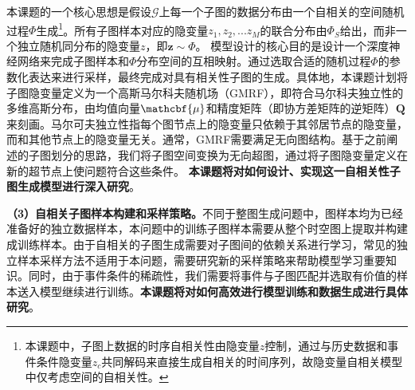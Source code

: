 \documentclass[12pt,UTF8,AutoFakeBold=2,a4paper]{ctexart} %
\begin{document}
本课题的一个核心思想是假设$\mathcal{G}$上每一个子图的数据分布由一个自相关的空间随机过程$\Phi$生成\footnote{本课题中，子图上数据的时序自相关性由隐变量$z$控制，通过与历史数据和事件条件隐变量$z_c$共同解码来直接生成自相关的时间序列，故隐变量自相关模型中仅考虑空间的自相关性。}。所有子图样本对应的隐变量$z_1, z_2, ... z_M$的联合分布由$\Phi_S$给出，而非一个独立随机同分布的隐变量$z$，即$\mathbf{z}\sim\Phi$。%
模型设计的核心目的是设计一个深度神经网络来完成子图样本和$\Phi$分布空间的互相映射。通过选取合适的随机过程$\Phi$的参数化表达来进行采样，最终完成对具有相关性子图的生成。具体地，本课题计划将子图隐变量定义为一个高斯马尔科夫随机场（GMRF），即符合马尔科夫独立性的多维高斯分布，由均值向量$\mathcbf{\mu}$和精度矩阵（即协方差矩阵的逆矩阵）$\mathbf{Q}$来刻画。马尔可夫独立性指每个图节点上的隐变量只依赖于其邻居节点的隐变量，而和其他节点上的隐变量无关。通常，GMRF需要满足无向图结构。基于之前阐述的子图划分的思路，我们将子图空间变换为无向超图，通过将子图隐变量定义在新的超节点上使问题符合这些条件。%
\textbf{本课题将对如何设计、实现这一自相关性子图生成模型进行深入研究}。

\textbf{（3）自相关子图样本构建和采样策略。}不同于整图生成问题中，图样本均为已经准备好的独立数据样本，本问题中的训练子图样本需要从整个时空图上提取并构建成训练样本。由于自相关的子图生成需要对子图间的依赖关系进行学习，常见的独立样本采样方法不适用于本问题，需要研究新的采样策略来帮助模型学习重要知识。同时，由于事件条件的稀疏性，我们需要将事件与子图匹配并选取有价值的样本送入模型继续进行训练。\textbf{本课题将对如何高效进行模型训练和数据生成进行具体研究}。


\end{document}
